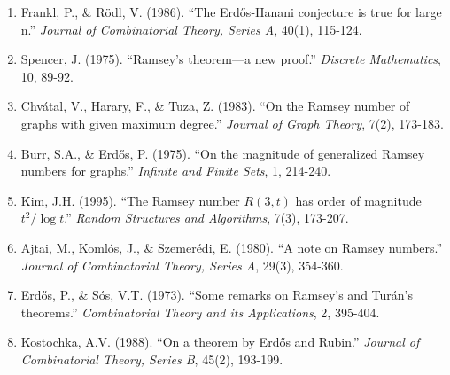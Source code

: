 \documentclass[12pt]{article}
\begin{document}
\begin{enumerate}
    \item Frankl, P., \& Rödl, V. (1986). ``The Erdős-Hanani conjecture is true for large n.'' \textit{Journal of Combinatorial Theory, Series A}, 40(1), 115-124.
    \item Spencer, J. (1975). ``Ramsey's theorem—a new proof.'' \textit{Discrete Mathematics}, 10, 89-92.
    \item Chvátal, V., Harary, F., \& Tuza, Z. (1983). ``On the Ramsey number of graphs with given maximum degree.'' \textit{Journal of Graph Theory}, 7(2), 173-183.
    \item Burr, S.A., \& Erdős, P. (1975). ``On the magnitude of generalized Ramsey numbers for graphs.'' \textit{Infinite and Finite Sets}, 1, 214-240.
    \item Kim, J.H. (1995). ``The Ramsey number $R(3,t)$ has order of magnitude $t^2/\log t$.'' \textit{Random Structures and Algorithms}, 7(3), 173-207.
    \item Ajtai, M., Komlós, J., \& Szemerédi, E. (1980). ``A note on Ramsey numbers.'' \textit{Journal of Combinatorial Theory, Series A}, 29(3), 354-360.
    \item Erdős, P., \& Sós, V.T. (1973). ``Some remarks on Ramsey's and Turán's theorems.'' \textit{Combinatorial Theory and its Applications}, 2, 395-404.
    \item Kostochka, A.V. (1988). ``On a theorem by Erdős and Rubin.'' \textit{Journal of Combinatorial Theory, Series B}, 45(2), 193-199.
\end{enumerate}
\end{document}
